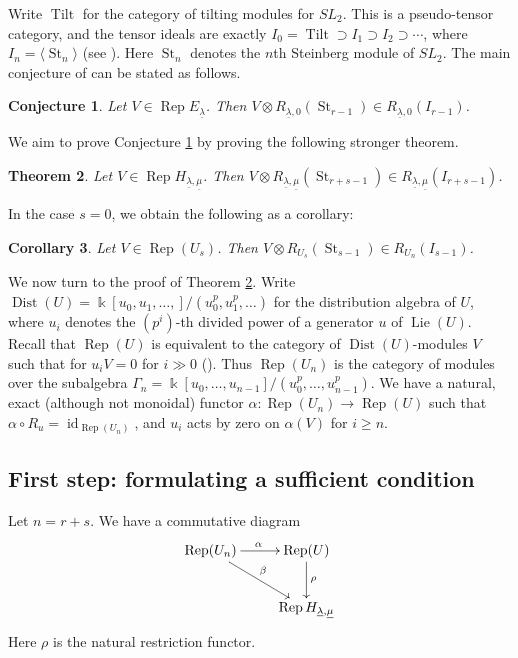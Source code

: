 \documentclass[11pt]{amsart}
\def\Rep{\operatorname{Rep}}
\def\ul{\underline}
\newtheorem{thm}{Theorem}[section]
\newtheorem{cor}[thm]{Corollary}
\newtheorem{conj}[thm]{Conjecture}
\theoremstyle{definition}
\theoremstyle{remark}
\numberwithin{equation}{section}
\begin{document}
Write $\operatorname{Tilt}$ for the category of tilting modules for $SL_2$.  This is a pseudo-tensor category, and the tensor ideals are exactly $I_0=\operatorname{Tilt}\supset I_1\supset I_2\supset\cdots$, where $I_n=\langle\operatorname{St}_n\rangle$ (see \cite{C}).  Here $\operatorname{St}_n$ denotes the $n$th Steinberg module of $SL_2$.  The main conjecture of \cite{CF} can be stated as follows.



\begin{conj}\label{conj}
    Let $V\in\Rep E_{\underline{\lambda}}$.  Then $V\otimes R_{\ul{\lambda},0}(\operatorname{St}_{r-1})\in R_{\ul{\lambda},0}(I_{r-1})$.
\end{conj}

We aim to prove Conjecture \ref{conj} by proving the following stronger theorem.

\begin{thm}\label{thm CF saturation}
    Let $V\in\Rep H_{\underline{\lambda},\underline{\mu}}$.  Then $V\otimes R_{\underline{\lambda},\underline{\mu}}(\operatorname{St}_{r+s-1})\in R_{\underline{\lambda},\underline{\mu}}(I_{r+s-1})$.
\end{thm}

In the case $s=0$, we obtain the following as a corollary:

\begin{cor}\label{cor 3.3}
      Let $V\in\Rep (U_s)$.  Then $V\otimes R_{U_s}(\operatorname{St}_{s-1})\in R_{U_n}(I_{s-1})$.
\end{cor}



We now turn to the proof of Theorem \ref{thm CF saturation}.  Write $\operatorname{Dist}(U)=\Bbbk[u_0,u_1,\dots,]/(u_0^p,u_1^p,\dots)$ for the distribution algebra of $U$, where $u_i$ denotes the $(p^i)$-th divided power of a generator $u$ of $\operatorname{Lie}(U)$.  Recall that $\Rep(U)$ is equivalent to the category of $\operatorname{Dist}(U)$-modules $V$ such that for $u_iV=0$ for $i\gg 0$ (\cite{F}).  Thus $\Rep(U_n)$ is the category of modules over the subalgebra $\Gamma_n=\Bbbk[u_0,\dots,u_{n-1}]/(u_0^p,\dots,u_{n-1}^p)$. We have a natural, exact (although not monoidal) functor $\alpha:\Rep(U_n)\to\Rep(U)$ such that $\alpha\circ R_u=\operatorname{id}_{\Rep(U_n)}$, and $u_i$ acts by zero on $\alpha(V)$ for $i\geq n$.
 
\subsection{First step: formulating a sufficient condition}     Let $n=r+s$.  We have a commutative diagram 
\[
\xymatrix{\Rep(U_n) \ar[r]^{\alpha}\ar[dr]^{\beta} & \Rep(U)\ar[d]^\rho\\
& \Rep H_{\underline{\lambda},\underline{\mu}}}
\]
Here $\rho$ is the natural restriction functor.  
\end{document}
